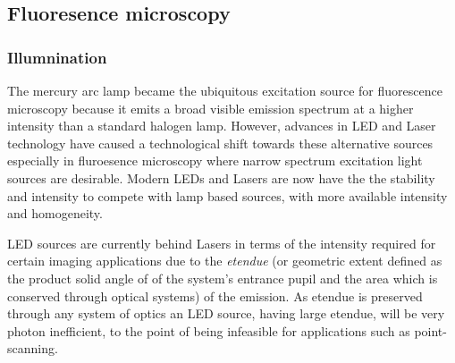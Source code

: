 \subsection{Fluoresence microscopy}

\subsubsection{Illumnination}

The mercury arc lamp became the ubiquitous excitation source for fluorescence microscopy because it emits a broad visible emission spectrum at a higher intensity than a standard halogen lamp.
However, advances in \gls{LED} and \gls{Laser} technology have caused a technological shift towards these alternative sources especially in fluroesence microscopy where narrow spectrum excitation light sources are desirable.
Modern \gls{LED}s and \gls{Laser}s are now have the the stability and intensity to compete with lamp based sources, with more available intensity and homogeneity.

\gls{LED} sources are currently behind Lasers in terms of the intensity required for certain imaging applications due to the \emph{\gls{etendue}} (or geometric extent defined as the product solid angle of of the system's entrance pupil and the area which is conserved through optical systems) of the emission.
As \gls{etendue} is preserved through any system of optics an \gls{LED} source, having large \gls{etendue}, will be very photon inefficient, to the point of being infeasible for applications such as point-scanning.

